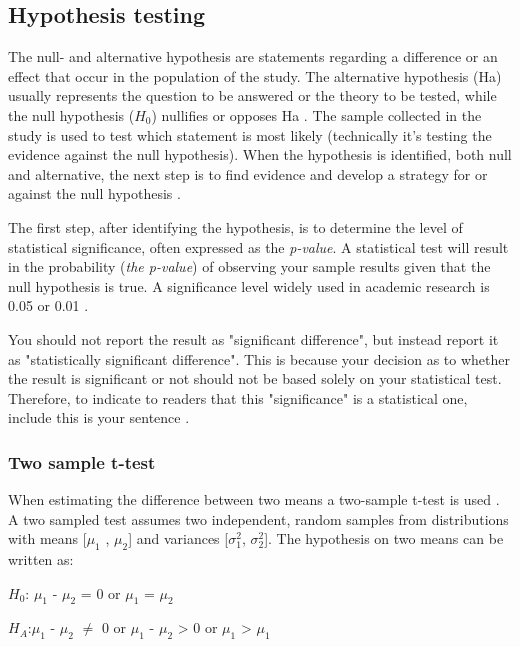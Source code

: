 \subsection{Hypothesis testing}\label{sec:hypothesistesting}
The null- and alternative hypothesis are statements regarding a difference or an effect that occur in the population of the study. The alternative hypothesis (Ha) usually represents the question to be answered or the theory to be tested, while the null hypothesis ($H_{0}$) nullifies or opposes Ha \citep{Walpole2012}. The sample collected in the study is used to test which statement is most likely (technically it's testing the evidence against the null hypothesis).  When the hypothesis is identified, both null and alternative, the next step is to find evidence and develop a strategy for or against the null hypothesis \citep{LundResearchLtd2013}.

The first step, after identifying the hypothesis, is to determine the level of statistical significance, often expressed as the \textit{p-value}. A statistical test will result in the probability (\textit{the p-value}) of observing your sample results given that the null hypothesis is true. A significance level widely used in academic research is 0.05 or 0.01 \citep{Walpole2012}. 

You should not report the result as "significant difference", but instead report it as "statistically significant difference". This is because your decision as to whether the result is significant or not should not be based solely on your statistical test. Therefore, to indicate to readers that this "significance" is a statistical one, include this is your sentence \citep{LundResearchLtd2013a}. 


\subsubsection{Two sample t-test}\label{sec:t-test}
When estimating the difference between two means a two-sample t-test is used \citep{Walpole2012}. A two sampled test assumes two independent, random samples from distributions with means [$\mu_{1}$ , $\mu_{2}$] and variances [$\sigma_{1}^{2}$, $\sigma_{2}^{2}$]. %
The hypothesis on two means can be written as:\newline

\centerline{$H_{0}$: $\mu_{1}$ - $\mu_{2}$ = 0 or $\mu_{1}$ = $\mu_{2}$} 
\centerline{$H_{A}$:$\mu_{1}$ - $\mu_{2}$ $\neq$ 0 or $\mu_{1}$ - $\mu_{2}$ > 0 or $\mu_{1}$ > $\mu_{1}$}

